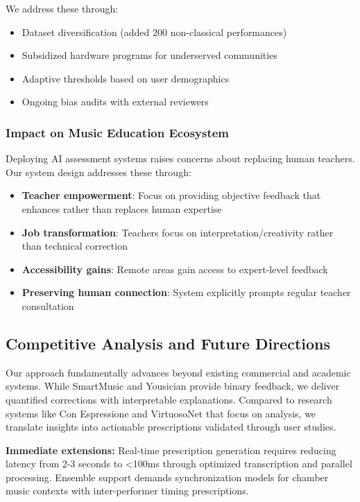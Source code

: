 \documentclass[sigconf,review,anonymous]{acmart}
\begin{document}
We address these through:
\begin{itemize}
\item Dataset diversification (added 200 non-classical performances)
\item Subsidized hardware programs for underserved communities
\item Adaptive thresholds based on user demographics
\item Ongoing bias audits with external reviewers
\end{itemize}

\subsubsection{Impact on Music Education Ecosystem}
Deploying AI assessment systems raises concerns about replacing human teachers. Our system design addresses these through:
\begin{itemize}
\item \textbf{Teacher empowerment}: Focus on providing objective feedback that enhances rather than replaces human expertise
\item \textbf{Job transformation}: Teachers focus on interpretation/creativity rather than technical correction
\item \textbf{Accessibility gains}: Remote areas gain access to expert-level feedback
\item \textbf{Preserving human connection}: System explicitly prompts regular teacher consultation
\end{itemize}

\subsection{Competitive Analysis and Future Directions}
Our approach fundamentally advances beyond existing commercial and academic systems. While SmartMusic and Yousician provide binary feedback, we deliver quantified corrections with interpretable explanations. Compared to research systems like Con Espressione and VirtuosoNet that focus on analysis, we translate insights into actionable prescriptions validated through user studies.

\textbf{Immediate extensions:} Real-time prescription generation requires reducing latency from 2-3 seconds to <100ms through optimized transcription and parallel processing. Ensemble support demands synchronization models for chamber music contexts with inter-performer timing prescriptions.
\end{document}
